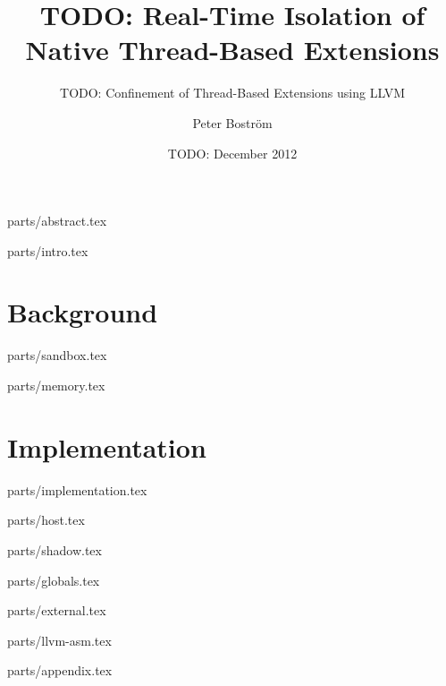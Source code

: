 \documentclass[a4paper,11pt]{xjobb/kth-mag}
\title {TODO: Real-Time Isolation of Native Thread-Based Extensions}
\subtitle {TODO: Confinement of Thread-Based Extensions using LLVM}
\author {Peter Boström}
\date {TODO: December 2012}
\begin{document}
\frontmatter
\pagestyle {empty}
\removepagenumbers
\maketitle
{}

 {parts/abstract.tex}

\clearpage
\tableofcontents*
\mainmatter
\pagestyle {newchap}

 {parts/intro.tex}

\part {Background}

 {parts/sandbox.tex}

 {parts/memory.tex}

\part {Implementation}

 {parts/implementation.tex}

 {parts/host.tex}

 {parts/shadow.tex}

 {parts/globals.tex}

 {parts/external.tex}

 {parts/llvm-asm.tex}

\appendix
\addappheadtotoc

 {parts/appendix.tex}
\end{document}
